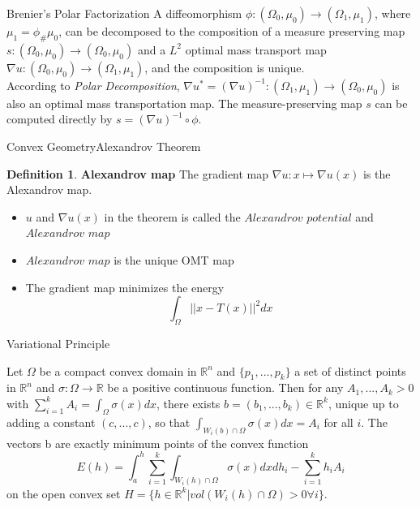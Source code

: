 \documentclass{beamer}
\theoremstyle{definition}
\newtheorem{mydef}{Definition}
\begin{document}
\begin{frame}{Brenier's Polar Factorization}
A diffeomorphism $\phi:(\Omega_0,\mu_0)\rightarrow (\Omega_1, \mu_1)$, where $\mu_1=\phi_\#\mu_0$, can be decomposed to the composition of a measure preserving map $s:(\Omega_0,\mu_0)\rightarrow (\Omega_0, \mu_0)$ and a $L^2$ optimal mass transport map~\cite{brenier1991polar} $\nabla u:(\Omega_0,\mu_0)\rightarrow (\Omega_1, \mu_1)$, and the composition is unique.\\

According to \textit{Polar Decomposition}, $\nabla u^*=(\nabla u)^{-1}:(\Omega_1, \mu_1)\rightarrow (\Omega_0,\mu_0)$ is also an optimal mass transportation map. The measure-preserving map $s$ can be computed directly by $s=(\nabla u)^{-1}\circ \phi$.
\end{frame}



\begin{frame}{Convex Geometry}{Alexandrov Theorem}
\begin{mydef}
\textbf{Alexandrov map} The gradient map $\nabla u:x\mapsto\nabla u(x)$ is the Alexandrov map.
\label{def:alexmap}
\end{mydef}
\begin{itemize}
\item $u$ and $\nabla u(x)$ in the theorem is called the $Alexandrov$ $ potential$ and $Alexandrov$ $map$
\item $Alexandrov$ $ map$ is the unique OMT map
\item The gradient map minimizes the energy $$\int _\Omega||x-T(x)||^2dx$$
\end{itemize}
\end{frame}

\begin{frame}{Variational Principle}
\begin{theorem}
Let $\Omega$ be a compact convex domain in $\mathbb{R}^n$ and $\{p_1,...,p_k\}$ a set of distinct points in $\mathbb{R}^n$ and $\sigma:\Omega \rightarrow \mathbb{R}$ be a positive continuous function. Then for any $A_1,...,A_k>0$ with $\sum^k_{i=1}A_i=\int_\Omega \sigma(x)dx$, there exists $b=(b_1,...,b_k)\in \mathbb{R}^k$, unique up to adding a constant $(c,...,c)$, so that $\int_{W_i(b)\cap\Omega}\sigma(x)dx=A_i$ for all $i$. The vectors b are exactly minimum points of the convex function $$E(h) = \int ^h_a \sum^k_{i=1}\int_{W_i(h)\cap \Omega}\sigma(x)dxdh_i-\sum^k_{i=1}h_iA_i$$
on the open convex set $H=\{h\in\mathbb{R}^k|vol({W_i(h)\cap \Omega})>0  \forall i\}$.
\label{thm:1.2}
\end{theorem}
\end{frame}
\end{document}
